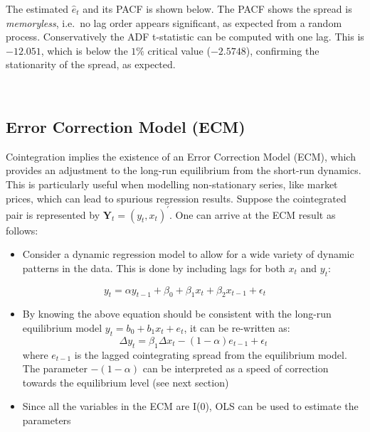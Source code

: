 \documentclass[11pt]{article}
\providecommand{\tightlist}{%
      \setlength{\itemsep}{0pt}\setlength{\parskip}{0pt}}
\begin{document}
The
estimated \(\hat{e}_t\) and its PACF is shown below. The PACF shows the spread is
\emph{memoryless}, i.e.~no lag order appears significant, as expected from a
random  process. Conservatively the ADF
t-statistic can be computed with one lag. This is \(-12.051\), which is
below the \(1\%\) critical value (\(-2.5748\)), confirming the
stationarity of the spread, as expected.

    { \hspace*{\fill} \\}
    
    \begin{center}
    \end{center}
    
    \subsection{Error Correction Model (ECM)}\label{error-correction-model-ecm}
    
Cointegration implies the existence of an Error Correction Model (ECM),
which provides an adjustment to the long-run equilibrium from the
short-run dynamics. This is particularly useful when modelling
non-stationary series, like market prices, which can lead to spurious
regression results.
Suppose the cointegrated pair is represented by $\mathbf{Y}_t = (y_t,
x_t)^{\prime} $. One can arrive at the ECM result as follows:
\begin{itemize}
\tightlist
\item
  Consider a dynamic regression model to allow for a wide variety of
  dynamic patterns in the data. This is done by including lags for both
  \(x_t\) and \(y_t\):
\end{itemize}
\begin{equation}
y_t = \alpha y_{t-1} +  \beta_0 + \beta_1 x_t + \beta_2 x_{t-1} + \epsilon_t
\end{equation}
\begin{itemize}
\item
  By knowing the above equation should be consistent with the long-run
  equilibrium model \(y_t = b_0 + b_1 x_t + e_t\), it can be re-written
  as:
  \begin{equation}
  \Delta y_{t} = \beta_1 \Delta x_t - (1- \alpha) e_{t-1} + \epsilon_t
  \end{equation}
  where \(e_{t-1}\) is the lagged cointegrating spread from the
  equilibrium model. The parameter \(-(1-\alpha)\) can be  interpreted as a
  speed of correction towards the equilibrium level (see next
  section)
\item
  Since all the variables in the ECM are I(0), OLS can be used to
  estimate the parameters
\end{itemize}
\end{document}
